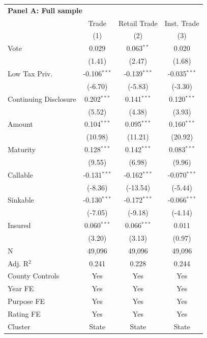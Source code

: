\begingroup
\centering
\begin{tabular*}{\textwidth}{@{\extracolsep{\fill}}lccc}
\multicolumn{5}{l}{\textbf{Panel A: Full sample}}\\

\addlinespace
   \toprule
                         & Trade          & Retail Trade   & Inst. Trade\\  
                         & (1)            & (2)            & (3)\\  
   \midrule 
   Vote                  & 0.029          & 0.063$^{**}$   & 0.020\\   
                         & (1.41)        & (2.47)        & (1.68)\\   
   Low Tax Priv.         & -0.106$^{***}$ & -0.139$^{***}$ & -0.035$^{***}$\\   
                         & (-6.70)       & (-5.83)       & (-3.30)\\   
   Continuing Disclosure & 0.202$^{***}$  & 0.141$^{***}$  & 0.120$^{***}$\\   
                         & (5.52)        & (4.38)        & (3.93)\\   
   Amount                & 0.104$^{***}$  & 0.095$^{***}$  & 0.160$^{***}$\\   
                         & (10.98)       & (11.21)       & (20.92)\\   
   Maturity              & 0.128$^{***}$  & 0.142$^{***}$  & 0.083$^{***}$\\   
                         & (9.55)        & (6.98)        & (9.96)\\   
   Callable              & -0.131$^{***}$ & -0.162$^{***}$ & -0.070$^{***}$\\   
                         & (-8.36)       & (-13.54)      & (-5.44)\\   
   Sinkable              & -0.130$^{***}$ & -0.172$^{***}$ & -0.066$^{***}$\\   
                         & (-7.05)       & (-9.18)       & (-4.14)\\   
   Insured               & 0.060$^{***}$  & 0.066$^{***}$  & 0.011\\   
                         & (3.20)        & (3.13)        & (0.97)\\   
   \hline
   N          & 49,096         & 49,096         & 49,096\\  
   Adj. R$^2$        & 0.241          & 0.228          & 0.244\\  
   County Controls       & Yes            & Yes            & Yes\\  
   Year FE               & Yes            & Yes            & Yes\\  
   Purpose FE            & Yes            & Yes            & Yes\\  
   Rating FE             & Yes            & Yes            & Yes\\  
   Cluster              & State & State & State\\  
   \bottomrule
\end{tabular*}
\par\endgroup
